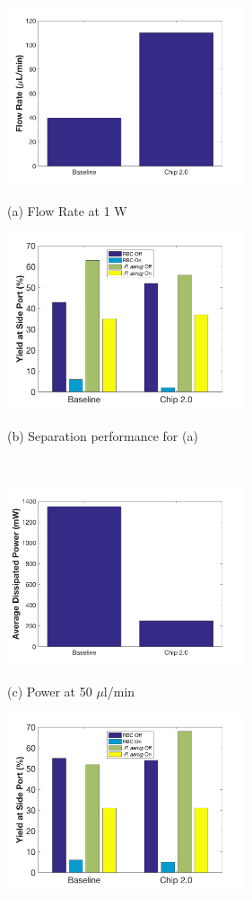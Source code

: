 \begin{figure}[H]
  \begin{minipage}[t]{0.49\linewidth}\centering
    \includegraphics[width=7cm]{flowBac}
    \medskip
    \centerline{(a) Flow Rate at 1 W}
  \end{minipage}\hfill
  \begin{minipage}[t]{0.49\linewidth}\centering
    \includegraphics[width=7cm]{maxFlow}
    \medskip
    \centerline{(b) Separation performance for (a)}
  \end{minipage}\\
  \begin{minipage}[t]{0.49\linewidth}\centering
    \includegraphics[width=7cm]{powerBac}
    \medskip
    \centerline{(c) Power at 50 $\mu$l/min}
  \end{minipage}\hfill
  \begin{minipage}[t]{0.49\linewidth}\centering
    \includegraphics[width=7cm]{minPower}

\end{minipage}
\end{figure}
